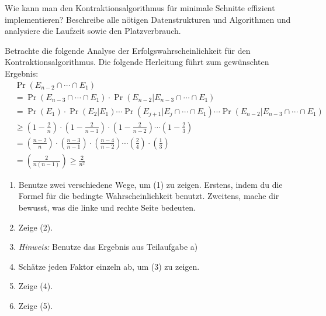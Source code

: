 \documentclass{uebung_cs}
\begin{document}
\begin{aufgabe}
	Wie kann man den Kontraktionsalgorithmus für minimale Schnitte effizient implementieren? Beschreibe alle nötigen Datenstrukturen und Algorithmen und analysiere die Laufzeit sowie den Platzverbrauch.
\end{aufgabe}

\begin{aufgabe}
	Betrachte die folgende Analyse der Erfolgswahrscheinlichkeit für den Kontraktionsalgorithmus. Die folgende Herleitung führt zum gewünschten Ergebnis:
	\begin{align}
		&\nonumber\Pr(E_{n-2} \cap \cdots \cap E_1) \\
		&= \Pr(E_{n-3} \cap \cdots \cap E_1) \cdot \Pr(E_{n-2}|E_{n-3} \cap \cdots \cap E_1) \\
		&= \Pr(E_1) \cdot \Pr(E_2|E_1) \cdots \Pr(E_{j+1} | E_j \cap \cdots \cap E_1) \cdots \Pr(E_{n-2} | E_{n-3} \cap \cdots \cap E_1) \\
		&\ge \left(1 - \frac{2}{n} \right) \cdot \left(1 - \frac{2}{n-1} \right) \cdot \left(1 - \frac{2}{n-2} \right) \cdots \left(1 - \frac{2}{3} \right) \\
		&= \left(\frac{n-2}{n}\right) \cdot \left(\frac{n-3}{n-1}\right) \cdot \left(\frac{n-4}{n-2}\right) \cdots \left(\frac{2}{4}\right) \cdot \left(\frac{1}{3}\right) \\
		&= \left(\frac{2}{n(n-1)}\right) \geq \frac{2}{n^2}
	\end{align}
	\begin{enumerate}
		\item Benutze zwei verschiedene Wege, um (1) zu zeigen. Erstens, indem du die Formel für die bedingte Wahrscheinlichkeit benutzt. Zweitens, mache dir bewusst, was die linke und rechte Seite bedeuten.
		\item Zeige (2). 
		\item[] \textit{Hinweis:} Benutze das Ergebnis aus Teilaufgabe a)
		\item Schätze jeden Faktor einzeln ab, um (3) zu zeigen. 
		\item Zeige (4).
		\item Zeige (5).
	\end{enumerate}
\end{aufgabe}
\end{document}
